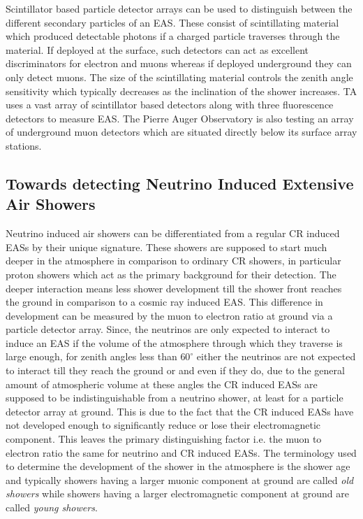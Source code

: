 Scintillator based particle detector arrays can be used to distinguish between the different secondary particles of an EAS. These consist of scintillating material which produced detectable photons if a charged particle traverses through the material. If deployed at the surface, such detectors can act as excellent discriminators for electron and muons whereas if deployed underground they can only detect muons. The size of the scintillating material controls the zenith angle sensitivity which typically decreases as the inclination of the shower increases. TA uses a vast array of scintillator based detectors along with three fluorescence detectors to measure EAS. The Pierre Auger Observatory is also testing an array of underground muon detectors which are situated directly below its surface array stations.


\subsection{Towards detecting Neutrino Induced Extensive Air Showers}
\label{sec:EAS_nu}
Neutrino induced air showers can be differentiated from a regular CR induced EASs by their unique signature. These showers are supposed to start much deeper in the atmosphere in comparison to ordinary CR showers, in particular proton showers which act as the primary background for their detection. The deeper interaction means less shower development till the shower front reaches the ground in comparison to a cosmic ray induced EAS. This difference in development can be measured by the muon to electron ratio at ground via a particle detector array. Since, the neutrinos are only expected to interact to induce an EAS if the volume of the atmosphere through which they traverse is large enough, for zenith angles less than $60^{\circ}$ either the neutrinos are not expected to interact till they reach the ground or and even if they do, due to the general amount of atmospheric volume at these angles the CR induced EASs are supposed to be indistinguishable from a neutrino shower, at least for a particle detector array at ground. This is due to the fact that the CR induced EASs have not developed enough to significantly reduce or lose their electromagnetic component. This leaves the primary distinguishing factor i.e. the muon to electron ratio the same for neutrino and CR induced EASs. The terminology used to determine the development of the shower in the atmosphere is the shower age and typically showers having a larger muonic component at ground are called \textit{old showers} while showers having a larger electromagnetic component at ground are called \textit{young showers}. 

